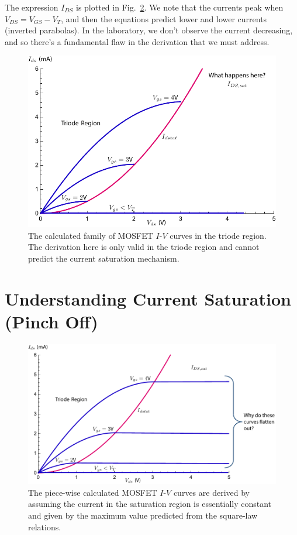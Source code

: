 The expression $I_{DS}$ is plotted in Fig.~\ref{fig:ids_triode_only}.  We note that the currents peak when $V_{DS} = V_{GS} - V_T$, and then the equations predict lower and lower currents (inverted parabolas).  In the laboratory, we don't observe the current decreasing, and so there's a fundamental flaw in the derivation that we must address.  

\begin{figure}[tb]
\begin{center}
\includegraphics[width=.75\columnwidth]{ids_triode_only} 
\end{center}
\caption{The calculated family of MOSFET $I$-$V$ curves in the triode region.  The derivation here is only valid in the triode region and cannot predict the current saturation mechanism. } \label{fig:ids_triode_only}
\end{figure}






\section{Understanding Current Saturation (Pinch Off)}


\begin{figure}[tb]
\begin{center}
\includegraphics[width=.75\columnwidth]{ids_idsat_full} 
\end{center}
\caption{The piece-wise calculated MOSFET $I$-$V$ curves are derived by assuming the current in the saturation region is essentially constant and given by the maximum value predicted from the square-law relations.  } \label{fig:ids_triode_only}
\end{figure}

